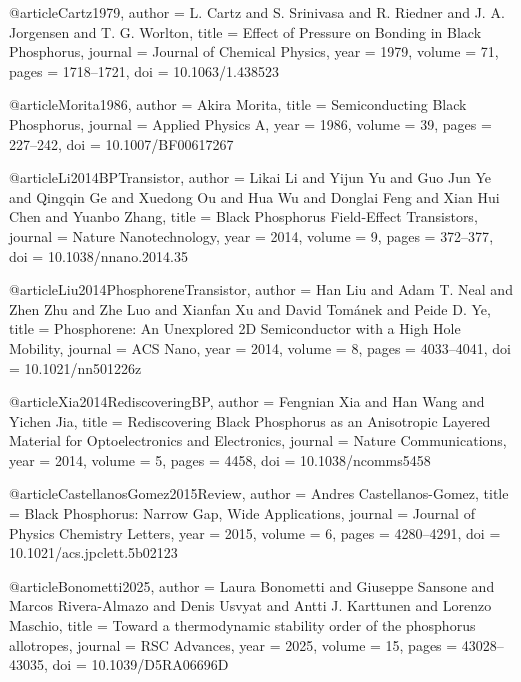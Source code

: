 @article{Cartz1979,
  author    = {L. Cartz and S. Srinivasa and R. Riedner and J. A. Jorgensen and T. G. Worlton},
  title     = {Effect of Pressure on Bonding in Black Phosphorus},
  journal   = {Journal of Chemical Physics},
  year      = {1979},
  volume    = {71},
  pages     = {1718--1721},
  doi       = {10.1063/1.438523}
}

@article{Morita1986,
  author    = {Akira Morita},
  title     = {Semiconducting Black Phosphorus},
  journal   = {Applied Physics A},
  year      = {1986},
  volume    = {39},
  pages     = {227--242},
  doi       = {10.1007/BF00617267}
}

@article{Li2014BPTransistor,
  author    = {Likai Li and Yijun Yu and Guo Jun Ye and Qingqin Ge and Xuedong Ou and Hua Wu and Donglai Feng and Xian Hui Chen and Yuanbo Zhang},
  title     = {Black Phosphorus Field-Effect Transistors},
  journal   = {Nature Nanotechnology},
  year      = {2014},
  volume    = {9},
  pages     = {372--377},
  doi       = {10.1038/nnano.2014.35}
}

@article{Liu2014PhosphoreneTransistor,
  author    = {Han Liu and Adam T. Neal and Zhen Zhu and Zhe Luo and Xianfan Xu and David Tom\'anek and Peide D. Ye},
  title     = {Phosphorene: An Unexplored 2D Semiconductor with a High Hole Mobility},
  journal   = {ACS Nano},
  year      = {2014},
  volume    = {8},
  pages     = {4033--4041},
  doi       = {10.1021/nn501226z}
}

@article{Xia2014RediscoveringBP,
  author    = {Fengnian Xia and Han Wang and Yichen Jia},
  title     = {Rediscovering Black Phosphorus as an Anisotropic Layered Material for Optoelectronics and Electronics},
  journal   = {Nature Communications},
  year      = {2014},
  volume    = {5},
  pages     = {4458},
  doi       = {10.1038/ncomms5458}
}

@article{CastellanosGomez2015Review,
  author    = {Andres Castellanos-Gomez},
  title     = {Black Phosphorus: Narrow Gap, Wide Applications},
  journal   = {Journal of Physics Chemistry Letters},
  year      = {2015},
  volume    = {6},
  pages     = {4280--4291},
  doi       = {10.1021/acs.jpclett.5b02123}
}

@article{Bonometti2025,
  author    = {Laura Bonometti and Giuseppe Sansone and Marcos Rivera-Almazo and Denis Usvyat and Antti J. Karttunen and Lorenzo Maschio},
  title     = {Toward a thermodynamic stability order of the phosphorus allotropes},
  journal   = {RSC Advances},
  year      = {2025},
  volume    = {15},
  pages     = {43028--43035},
  doi       = {10.1039/D5RA06696D}
}


